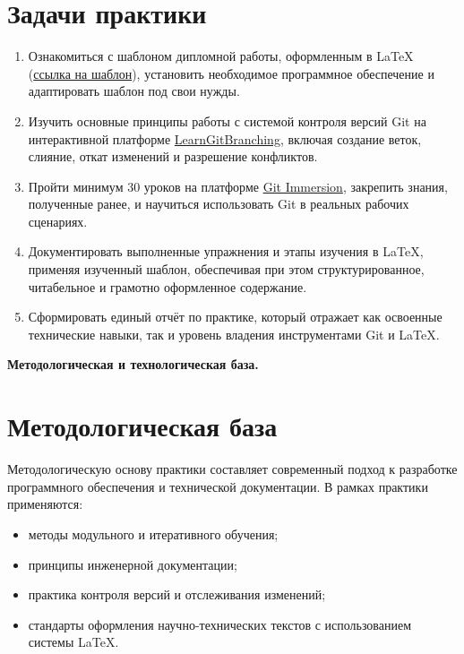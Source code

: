 \documentclass[a4paper,12pt]{report}
\begin{document}
\section*{Задачи практики}
\begin{enumerate}
    \item Ознакомиться с шаблоном дипломной работы, оформленным в \LaTeX{} (\href{https://github.com/AntonC9018/uni_thesisTemplate}{ссылка на шаблон}), установить необходимое программное обеспечение и адаптировать шаблон под свои нужды.
    \item Изучить основные принципы работы с системой контроля версий Git на интерактивной платформе \href{https://learngitbranching.js.org/}{LearnGitBranching}, включая создание веток, слияние, откат изменений и разрешение конфликтов.
    \item Пройти минимум 30 уроков на платформе \href{https://gitimmersion.com/index.html}{Git Immersion}, закрепить знания, полученные ранее, и научиться использовать Git в реальных рабочих сценариях.
    \item Документировать выполненные упражнения и этапы изучения в \LaTeX{}, применяя изученный шаблон, обеспечивая при этом структурированное, читабельное и грамотно оформленное содержание.
    \item Сформировать единый отчёт по практике, который отражает как освоенные технические навыки, так и уровень владения инструментами Git и \LaTeX{}.
\end{enumerate}

\textbf{Методологическая и технологическая база.}
\section*{Методологическая база}

Методологическую основу практики составляет современный подход к разработке программного обеспечения и технической документации.  
В рамках практики применяются:

\begin{itemize}
    \item методы модульного и итеративного обучения;
    \item принципы инженерной документации;
    \item практика контроля версий и отслеживания изменений;
    \item стандарты оформления научно-технических текстов с использованием системы \LaTeX.
\end{itemize}
\end{document}
